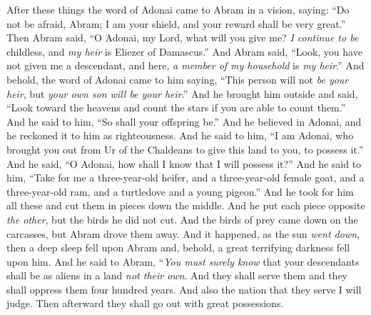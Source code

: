 \begin{biblechapter} %
 After these things the word of Adonai came to Abram in a vision, saying: “Do not be afraid, Abram; I am your shield, and your reward shall be very great.”
\verse Then Abram said, “O Adonai, my Lord, what will you give me? \textit{I continue to be} childless, and \textit{my heir} is Eliezer of Damascus.”
\verse And Abram said, “Look, you have not given me a descendant, and here, \textit{a member of my household} is \textit{my heir}.”
\verse And behold, the word of Adonai came to him saying, “This person will not \textit{be your heir}, but \textit{your own son will be your heir}.”
\verse And he brought him outside and said, “Look toward the heavens and count the stars if you are able to count them.” And he said to him, “So shall your offspring be.”
\verse And he believed in Adonai, and he reckoned it to him as righteousness.
\verse And he said to him, “I am Adonai, who brought you out from Ur of the Chaldeans to give this land to you, to possess it.”
\verse And he said, “O Adonai, how shall I know that I will possess it?”
\verse And he said to him, “Take for me a three-year-old heifer, and a three-year-old female goat, and a three-year-old ram, and a turtledove and a young pigeon.”
\verse And he took for him all these and cut them in pieces down the middle. And he put each piece opposite \textit{the other}, but the birds he did not cut.
\verse And the birds of prey came down on the carcasses, but Abram drove them away.
\verse And it happened, as the sun \textit{went down}, then a deep sleep fell upon Abram and, behold, a great terrifying darkness fell upon him.
\verse And he said to Abram, “\textit{You must surely know} that your descendants shall be as aliens in a land \textit{not their own}. And they shall serve them and they shall oppress them four hundred years.
\verse And also the nation that they serve I will judge. Then afterward they shall go out with great possessions.

\end{biblechapter}
